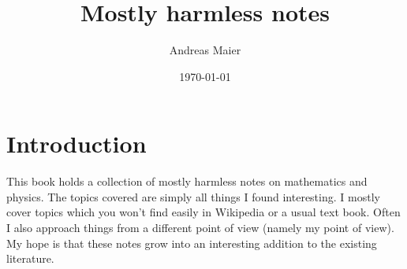 \documentclass[12pt,a4paper,twoside]{book}
\title{Mostly harmless notes}
\author{Andreas Maier}
\date{\today}
\begin{document}
\maketitle
\tableofcontents
\chapter{Introduction}
This book holds a collection of mostly harmless notes on mathematics and physics. The topics covered are simply all things I found interesting. I mostly cover topics which 
you won't find easily in Wikipedia or a usual text book. Often I also approach things from a different point of view (namely my point of view). My hope is that these notes grow into an interesting addition to the existing literature. 



\appendix
%




\end{document}

